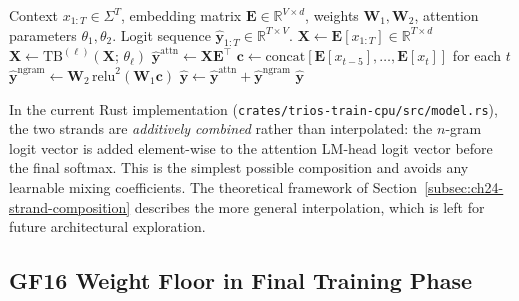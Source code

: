 \begin{algorithm}[htb]
\caption{IGLA champion forward pass (\texttt{ngram+2L\_hybrid\_attn\_relu2}).}
\label{alg:ch24-forward}
\begin{algorithmic}[1]
\Require Context $x_{1:T} \in \Sigma^T$, embedding matrix $\mathbf{E} \in \mathbb{R}^{V \times d}$,
         weights $\mathbf{W}_1, \mathbf{W}_2$, attention parameters $\theta_1, \theta_2$.
\Ensure Logit sequence $\hat{\mathbf{y}}_{1:T} \in \mathbb{R}^{T \times V}$.
\State $\mathbf{X} \leftarrow \mathbf{E}[x_{1:T}] \in \mathbb{R}^{T \times d}$ 
  
  \State $\mathbf{X} \leftarrow \mathrm{TB}^{(\ell)}(\mathbf{X};\,\theta_\ell)$
\EndFor
\State $\hat{\mathbf{y}}^{\text{attn}} \leftarrow \mathbf{X} \mathbf{E}^\top$
\State $\mathbf{c} \leftarrow \mathrm{concat}[\mathbf{E}[x_{t-5}], \ldots, \mathbf{E}[x_t]]$
       for each $t$
\State $\hat{\mathbf{y}}^{\text{ngram}} \leftarrow \mathbf{W}_2\,\mathrm{relu}^2(\mathbf{W}_1 \mathbf{c})$
\State $\hat{\mathbf{y}} \leftarrow \hat{\mathbf{y}}^{\text{attn}} + \hat{\mathbf{y}}^{\text{ngram}}$
\Return $\hat{\mathbf{y}}$
\end{algorithmic}
\end{algorithm}

In the current Rust implementation
(\texttt{crates/trios-train-cpu/src/model.rs}), the two strands are
\emph{additively combined} rather than interpolated: the $n$-gram logit vector
is added element-wise to the attention LM-head logit vector before the final
softmax.  This is the simplest possible composition and avoids any learnable
mixing coefficients.  The theoretical framework of
Section~\ref{subsec:ch24-strand-composition} describes the more general
interpolation, which is left for future architectural exploration.

\subsection{GF16 Weight Floor in Final Training Phase}
\label{subsec:ch24-gf16-floor}

